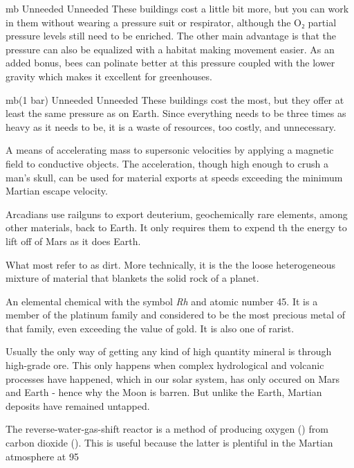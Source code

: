 {{    \bTR
       mb \eTC
      \bTC Unneeded \eTC
      \bTC Unneeded \eTC
      \bTC These buildings cost a little bit more, but you can work in them without wearing a pressure suit or respirator, although the O₂ partial pressure levels still need to be enriched. The other main advantage is that the pressure can also be equalized with a habitat making movement easier. As an added bonus, bees can polinate better at this pressure coupled with the lower gravity which makes it excellent for greenhouses. \eTC
    \eTR

    \bTR
       mb\crlf (1 bar) \eTC
      \bTC Unneeded \eTC
      \bTC Unneeded \eTC
      \bTC These buildings cost the most, but they offer at least the same pressure as on Earth. Since everything needs to be three times as heavy as it needs to be, it is a waste of resources, too costly, and unnecessary. \eTC
    \eTR
    \eTABLEbody

\eTABLE
}

A means of accelerating mass to supersonic velocities by applying a magnetic field to conductive objects. The acceleration, though high enough to crush a man's skull, can be used for material exports at speeds exceeding the minimum Martian escape velocity.

Arcadians use railguns to export deuterium, geochemically rare elements, among other materials, back to Earth. It only requires them to expend th the energy to lift off of Mars as it does Earth.

What most refer to as dirt. More technically, it is the the loose heterogeneous mixture of material that blankets the solid rock of a planet.

An elemental chemical with the symbol {\it Rh} and atomic number 45. It is a member of the platinum family and considered to be the most precious metal of that family, even exceeding the value of gold. It is also one of rarist. 

Usually the only way of getting any kind of high quantity mineral is through high-grade ore. This only happens when complex hydrological and volcanic processes have happened, which in our solar system, has only occured on Mars and Earth - hence why the Moon is barren. But unlike the Earth, Martian deposits have remained untapped.

The reverse-water-gas-shift reactor is a method of producing oxygen () from carbon dioxide (). This is useful because the latter is plentiful in the Martian atmosphere at 95\type{%

}}
